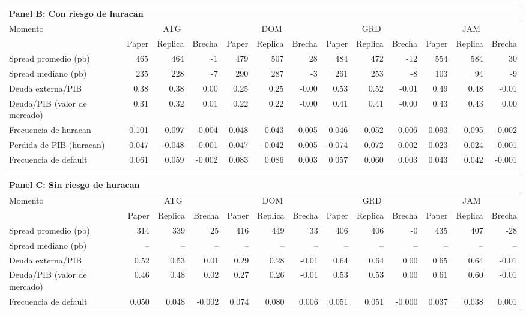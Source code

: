 
\begin{tabular}{lrrrrrrrrrrrr}
\toprule
\multicolumn{13}{l}{\textbf{Panel B: Con riesgo de huracan}} \\
\midrule
Momento & \multicolumn{3}{c}{ATG} & \multicolumn{3}{c}{DOM} & \multicolumn{3}{c}{GRD} & \multicolumn{3}{c}{JAM} \\
 & Paper & Replica & Brecha & Paper & Replica & Brecha & Paper & Replica & Brecha & Paper & Replica & Brecha \\
\midrule
Spread promedio (pb) & 465 & 464 & -1 & 479 & 507 & 28 & 484 & 472 & -12 & 554 & 584 & 30 \\
Spread mediano (pb) & 235 & 228 & -7 & 290 & 287 & -3 & 261 & 253 & -8 & 103 & 94 & -9 \\
Deuda externa/PIB & 0.38 & 0.38 & 0.00 & 0.25 & 0.25 & -0.00 & 0.53 & 0.52 & -0.01 & 0.49 & 0.48 & -0.01 \\
Deuda/PIB (valor de mercado) & 0.31 & 0.32 & 0.01 & 0.22 & 0.22 & -0.00 & 0.41 & 0.41 & -0.00 & 0.43 & 0.43 & 0.00 \\
Frecuencia de huracan & 0.101 & 0.097 & -0.004 & 0.048 & 0.043 & -0.005 & 0.046 & 0.052 & 0.006 & 0.093 & 0.095 & 0.002 \\
Perdida de PIB (huracan) & -0.047 & -0.048 & -0.001 & -0.047 & -0.042 & 0.005 & -0.074 & -0.072 & 0.002 & -0.023 & -0.024 & -0.001 \\
Frecuencia de default & 0.061 & 0.059 & -0.002 & 0.083 & 0.086 & 0.003 & 0.057 & 0.060 & 0.003 & 0.043 & 0.042 & -0.001 \\
\bottomrule
\end{tabular}

\begin{tabular}{lrrrrrrrrrrrr}
\toprule
\multicolumn{13}{l}{\textbf{Panel C: Sin riesgo de huracan}} \\
\midrule
Momento & \multicolumn{3}{c}{ATG} & \multicolumn{3}{c}{DOM} & \multicolumn{3}{c}{GRD} & \multicolumn{3}{c}{JAM} \\
 & Paper & Replica & Brecha & Paper & Replica & Brecha & Paper & Replica & Brecha & Paper & Replica & Brecha \\
\midrule
Spread promedio (pb) & 314 & 339 & 25 & 416 & 449 & 33 & 406 & 406 & -0 & 435 & 407 & -28 \\
Spread mediano (pb) & -- & -- & -- & -- & -- & -- & -- & -- & -- & -- & -- & -- \\
Deuda externa/PIB & 0.52 & 0.53 & 0.01 & 0.29 & 0.28 & -0.01 & 0.64 & 0.64 & 0.00 & 0.65 & 0.64 & -0.01 \\
Deuda/PIB (valor de mercado) & 0.46 & 0.48 & 0.02 & 0.27 & 0.26 & -0.01 & 0.53 & 0.53 & 0.00 & 0.61 & 0.60 & -0.01 \\
Frecuencia de default & 0.050 & 0.048 & -0.002 & 0.074 & 0.080 & 0.006 & 0.051 & 0.051 & -0.000 & 0.037 & 0.038 & 0.001 \\
\bottomrule
\end{tabular}
